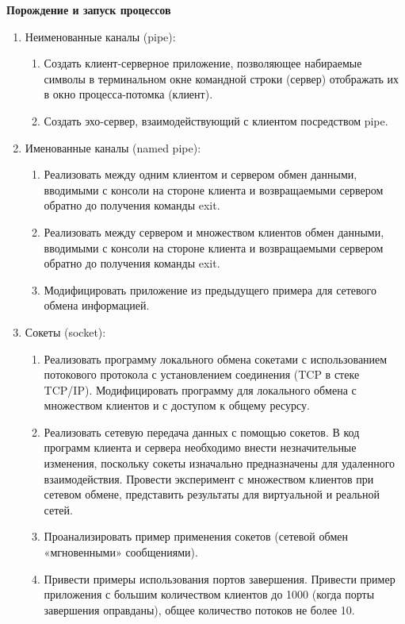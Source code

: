 \renewcommand{\labelenumii}{\theenumii}
\renewcommand{\theenumii}{\theenumi.\arabic{enumii}.}

\textbf{Порождение и запуск процессов}

\begin{enumerate}
	\item Неименованные каналы (pipe):
		\begin{enumerate}
			\item Создать клиент-серверное приложение, позволяющее набираемые символы в терминальном окне командной строки (сервер) отображать их в окно процесса-потомка (клиент).
			\item Создать эхо-сервер, взаимодействующий с клиентом посредством pipe.
		\end{enumerate}
	\item Именованные каналы (named pipe):
		\begin{enumerate}
			\item Реализовать между одним клиентом и сервером обмен данными, вводимыми с консоли на стороне клиента и возвращаемыми сервером обратно до получения команды exit.
			\item Реализовать между сервером и множеством клиентов обмен данными, вводимыми с консоли на стороне клиента и возвращаемыми сервером обратно до получения команды exit.
			\item Модифицировать приложение из предыдущего примера для сетевого обмена информацией.
		\end{enumerate}
	\item Сокеты (socket):
		\begin{enumerate}
			\item Реализовать программу локального обмена сокетами с использованием потокового протокола с установлением соединения (TCP в стеке TCP/IP). Модифицировать программу для локального обмена с множеством клиентов и с доступом к общему ресурсу.
			\item Реализовать сетевую передача данных с помощью сокетов. В код программ клиента и сервера необходимо внести незначительные изменения, поскольку сокеты изначально предназначены для удаленного взаимодействия. Провести эксперимент с множеством клиентов при сетевом обмене, представить результаты для виртуальной и реальной сетей.
			\item Проанализировать пример применения сокетов (сетевой обмен «мгновенными» сообщениями).
			\item Привести примеры использования портов завершения. Привести пример приложения с большим количеством клиентов до 1000 (когда порты завершения оправданы), общее количество потоков не более 10.

\end{enumerate}
\end{enumerate}
